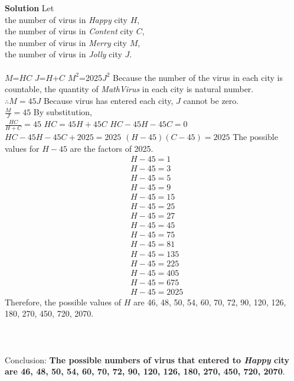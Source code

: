 \documentclass[12pt]{article}
\begin{document}
\noindent
\textbf{Solution}
\newline
Let\\
the number of virus in \textit{Happy} city $H$, \\
the number of virus in \textit{Content} city $C$, \\
the number of virus in \textit{Merry} city $M$, \\
the number of virus in \textit{Jolly} city $J$.
\\\\
$M$=$H$$C$
\newline
$J$=$H$+$C$
\newline
$M^2$=2025$J^2$
\newline
\newline
Because the number of the virus in each city is countable, the quantity of \textit{MathVirus} in each city is natural number. \\
$\therefore M=45J$
\newline
\newline
Because virus has entered each city, $J$ cannot be zero. \\
$\frac{M}{J}=45$
\newline
\newline
By substitution, \\
$\frac{HC}{H+C}=45$
\newline
$HC=45H+45C$
\newline
$HC-45H-45C=0$
\newline
$HC-45H-45C+2025=2025$
\newline
$(H-45)(C-45)=2025$
\newline
\newline
The possible values for $H-45$ are the factors of 2025.
\begin{align*}
    &H-45=1 \\
    &H-45=3 \\
    &H-45=5 \\
    &H-45=9 \\
    &H-45=15 \\
    &H-45=25 \\
    &H-45=27 \\
    &H-45=45 \\
    &H-45=75 \\
    &H-45=81 \\
    &H-45=135 \\
    &H-45=225 \\
    &H-45=405 \\
    &H-45=675 \\
    &H-45=2025
\end{align*}
\noindent
Therefore, the possible values of $H$ are 46, 48, 50, 54, 60, 70, 72, 90, 120, 126, 180, 270, 450, 720, 2070.
\\\\
\\\\
Conclusion: \textbf{The possible numbers of virus that entered to \textit{Happy} city are 46, 48, 50, 54, 60, 70, 72, 90, 120, 126, 180, 270, 450, 720, 2070}.
\end{document}
